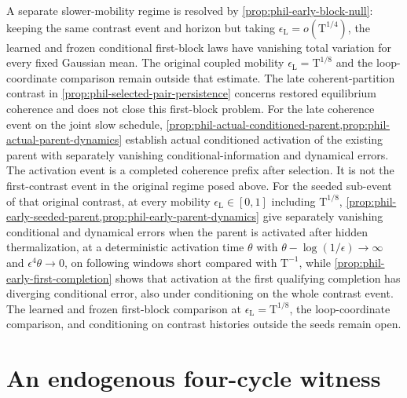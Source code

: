 A separate slower-mobility regime is resolved by
\cref{prop:phil-early-block-null}: keeping the same contrast event and
horizon but taking \(\epsilon_{\mathrm L}=o(\mathrm T^{1/4})\), the
learned and frozen conditional first-block laws have vanishing total
variation for every fixed Gaussian mean. The original coupled mobility
\(\epsilon_{\mathrm L}=\mathrm T^{1/8}\) and the loop-coordinate
comparison remain outside that estimate. The late coherent-partition
contrast in \cref{prop:phil-selected-pair-persistence} concerns restored
equilibrium coherence and does not close this first-block problem.
For the late coherence event on the joint slow schedule,
\cref{prop:phil-actual-conditioned-parent,prop:phil-actual-parent-dynamics}
establish actual conditioned activation of the existing parent with
separately vanishing conditional-information and dynamical errors.
The activation event is a completed coherence prefix after selection.
It is not the first-contrast event in the original regime posed above.
For the seeded sub-event of that original contrast, at every mobility
\(\epsilon_{\mathrm L}\in[0,1]\) including \(\mathrm T^{1/8}\),
\cref{prop:phil-early-seeded-parent,prop:phil-early-parent-dynamics} give
separately vanishing conditional and dynamical errors when the parent is
activated after hidden thermalization, at a deterministic activation time
\(\theta\) with \(\theta-\log(1/\epsilon)\to\infty\) and
\(\epsilon^4\theta\to0\), on following windows short compared with
\(\mathrm T^{-1}\), while
\cref{prop:phil-early-first-completion} shows that activation at the first
qualifying completion has diverging conditional error, also under
conditioning on the whole contrast event. The learned and frozen first-block
comparison at \(\epsilon_{\mathrm L}=\mathrm T^{1/8}\), the loop-coordinate
comparison, and conditioning on contrast histories outside the seeds remain
open.

\section{An endogenous four-cycle witness}
\label{sec:rg-formation-endogenous-cycle}

